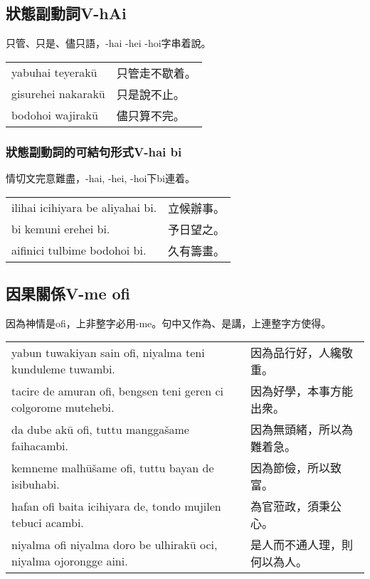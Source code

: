 \documentclass{article}
\begin{document}
\subsection{狀態副動詞V-hAi}
\noindent 只管、只是、儘只語，-hai -hei -hoi字串着說。
\begin{center}
    \begin{tabularx}{\textwidth}{XX}
        yabuhai teyerak\={u} & 只管走不歇着。\\
        gisurehei nakarak\={u} & 只是說不止。\\
        bodohoi wajirak\={u} & 儘只算不完。
    \end{tabularx}
\end{center}

\subsubsection{狀態副動詞的可結句形式V-hai bi}
\noindent 情切文完意難盡，-hai, -hei, -hoi下bi連着。
\begin{center}
    \begin{tabularx}{\textwidth}{XX}
        ilihai icihiyara be aliyahai bi. & 立候辦事。\\
        bi kemuni erehei bi. & 予日望之。\\
        aifinici tulbime bodohoi bi. & 久有籌畫。
    \end{tabularx}
\end{center}

\subsection{因果關係V-me ofi}
\noindent 因為神情是ofi，上非整字必用-me。句中又作為、是講，上連整字方使得。
\begin{center}
    \begin{tabularx}{\textwidth}{XX}
        yabun tuwakiyan sain ofi, niyalma teni kunduleme tuwambi. & 因為品行好，人纔敬重。\\
        tacire de amuran ofi, bengsen teni geren ci colgorome mutehebi. & 因為好學，本事方能出衆。\\
        da dube ak\={u} ofi, tuttu mangga\v{s}ame faihacambi. & 因為無頭緒，所以為難着急。\\
        kemneme malh\={u}\v{s}ame ofi, tuttu bayan de isibuhabi. & 因為節儉，所以致富。\\
        hafan ofi baita icihiyara de, tondo mujilen tebuci acambi. & 為官蒞政，須秉公心。\\
        niyalma ofi niyalma doro be ulhirak\={u} oci, niyalma ojorongge aini. & 是人而不通人理，則何以為人。
    \end{tabularx}
\end{center}
\end{document}
